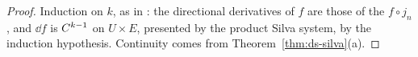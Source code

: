\begin{proof}
  \leanok
  Induction on $k$, as in \cite{GN26}: the directional derivatives of $f$ are those of the
  $f \circ j_n$, and $\dd f$ is $C^{k-1}$ on $U \times E$, presented by the product Silva system,
  by the induction hypothesis. Continuity comes from Theorem~\ref{thm:ds-silva}(a).
\end{proof}
